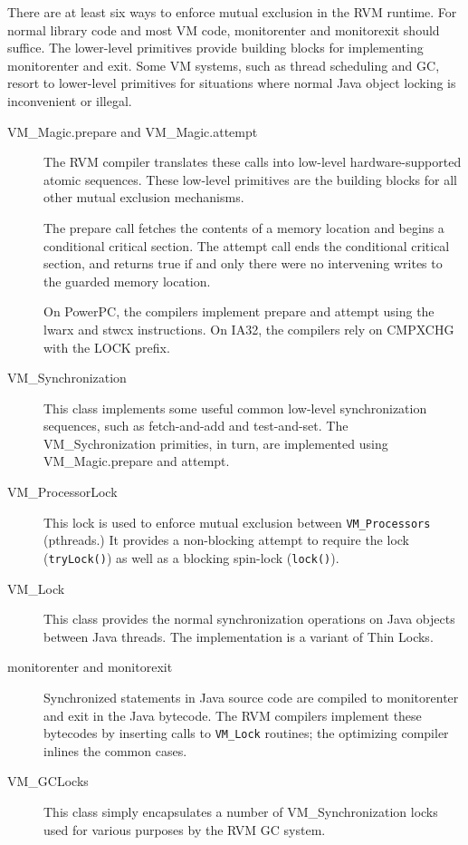 There are at least six ways to enforce mutual exclusion in the
RVM runtime.  For normal library code and most VM code, monitorenter and
monitorexit should suffice.  The lower-level primitives provide 
building blocks for implementing monitorenter and exit. Some VM systems,
such as thread scheduling and GC, resort to lower-level primitives for
situations where normal Java object locking is inconvenient or illegal.
\begin{description}
\item [VM\_Magic.prepare and VM\_Magic.attempt]
The RVM compiler translates these calls into low-level
hardware-supported atomic sequences.  These low-level primitives are the 
building blocks for all other mutual exclusion mechanisms. 

The prepare call fetches the
contents of a memory location and begins a conditional critical section.
The attempt call ends the conditional critical section, and returns true
if and only there were no intervening writes to the guarded memory
location.

On PowerPC, the compilers implement prepare and attempt using the lwarx
and stwcx instructions.  On IA32, the compilers rely on CMPXCHG with the
LOCK prefix.
\item [VM\_Synchronization]
This class implements some useful common low-level synchronization
sequences, such as fetch-and-add and test-and-set.  The VM\_Sychronization
primities, in turn, are implemented using VM\_Magic.prepare and attempt.
\item [VM\_ProcessorLock]
This lock is used to enforce mutual exclusion between {\tt VM\_Processors}
(pthreads.)  It provides a non-blocking attempt to require the lock
({\tt tryLock()}) as well as a blocking spin-lock ({\tt lock()}).
\item [VM\_Lock]
This class provides the normal synchronization operations on Java objects
between Java threads.  The implementation is a variant of Thin Locks.
\item [monitorenter and monitorexit]
Synchronized statements in Java source code are compiled to monitorenter
and exit in the Java bytecode.  The RVM compilers implement these
bytecodes by inserting calls to {\tt VM\_Lock} routines; the optimizing
compiler inlines the common cases.
\item [VM\_GCLocks]
This class simply encapsulates a number of VM\_Synchronization locks 
used for various purposes by the RVM GC system.

\end{description}

